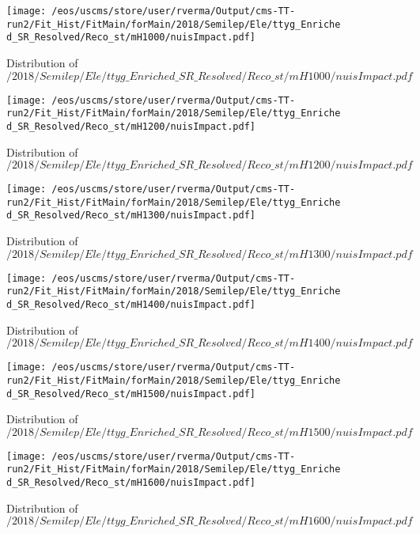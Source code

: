 \begin{figure}
\centering
\texttt{[image: /eos/uscms/store/user/rverma/Output/cms-TT-run2/Fit\_Hist/FitMain/forMain/2018/Semilep/Ele/ttyg\_Enriched\_SR\_Resolved/Reco\_st/mH1000/nuisImpact.pdf]}
\caption{Distribution of $/2018/Semilep/Ele/ttyg\_Enriched\_SR\_Resolved/Reco\_st/mH1000/nuisImpact.pdf$}
\end{figure}

\begin{figure}
\centering
\texttt{[image: /eos/uscms/store/user/rverma/Output/cms-TT-run2/Fit\_Hist/FitMain/forMain/2018/Semilep/Ele/ttyg\_Enriched\_SR\_Resolved/Reco\_st/mH1200/nuisImpact.pdf]}
\caption{Distribution of $/2018/Semilep/Ele/ttyg\_Enriched\_SR\_Resolved/Reco\_st/mH1200/nuisImpact.pdf$}
\end{figure}

\begin{figure}
\centering
\texttt{[image: /eos/uscms/store/user/rverma/Output/cms-TT-run2/Fit\_Hist/FitMain/forMain/2018/Semilep/Ele/ttyg\_Enriched\_SR\_Resolved/Reco\_st/mH1300/nuisImpact.pdf]}
\caption{Distribution of $/2018/Semilep/Ele/ttyg\_Enriched\_SR\_Resolved/Reco\_st/mH1300/nuisImpact.pdf$}
\end{figure}

\begin{figure}
\centering
\texttt{[image: /eos/uscms/store/user/rverma/Output/cms-TT-run2/Fit\_Hist/FitMain/forMain/2018/Semilep/Ele/ttyg\_Enriched\_SR\_Resolved/Reco\_st/mH1400/nuisImpact.pdf]}
\caption{Distribution of $/2018/Semilep/Ele/ttyg\_Enriched\_SR\_Resolved/Reco\_st/mH1400/nuisImpact.pdf$}
\end{figure}

\begin{figure}
\centering
\texttt{[image: /eos/uscms/store/user/rverma/Output/cms-TT-run2/Fit\_Hist/FitMain/forMain/2018/Semilep/Ele/ttyg\_Enriched\_SR\_Resolved/Reco\_st/mH1500/nuisImpact.pdf]}
\caption{Distribution of $/2018/Semilep/Ele/ttyg\_Enriched\_SR\_Resolved/Reco\_st/mH1500/nuisImpact.pdf$}
\end{figure}

\begin{figure}
\centering
\texttt{[image: /eos/uscms/store/user/rverma/Output/cms-TT-run2/Fit\_Hist/FitMain/forMain/2018/Semilep/Ele/ttyg\_Enriched\_SR\_Resolved/Reco\_st/mH1600/nuisImpact.pdf]}
\caption{Distribution of $/2018/Semilep/Ele/ttyg\_Enriched\_SR\_Resolved/Reco\_st/mH1600/nuisImpact.pdf$}
\end{figure}

